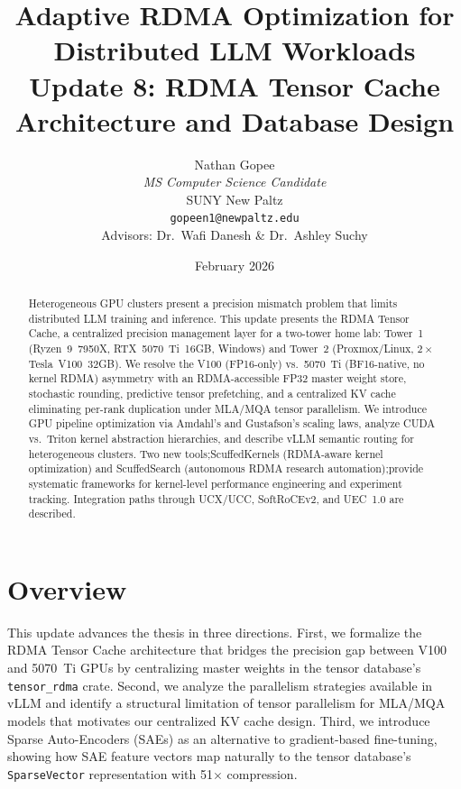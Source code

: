 \documentclass[11pt,letterpaper]{article}
\title{
    \vspace{-1cm}
    \textbf{Adaptive RDMA Optimization for Distributed LLM Workloads} \\[0.5em]
    \large Update 8: RDMA Tensor Cache Architecture and Database Design
}
\author{
    Nathan Gopee \\
    \textit{MS Computer Science Candidate} \\
    SUNY New Paltz \\
    \texttt{gopeen1@newpaltz.edu} \\[1em]
    \small Advisors: Dr.\ Wafi Danesh \& Dr.\ Ashley Suchy
}
\date{February 2026}
\theoremstyle{definition}
\begin{document}
\maketitle

\begin{abstract}
\noindent
Heterogeneous GPU clusters present a precision mismatch problem that limits distributed LLM training and inference. This update presents the RDMA Tensor Cache, a centralized precision management layer for a two-tower home lab: Tower~1 (Ryzen~9~7950X, RTX~5070~Ti~16GB, Windows) and Tower~2 (Proxmox/Linux, $2\times$ Tesla~V100~32GB). We resolve the V100 (FP16-only) vs.\ 5070~Ti (BF16-native, no kernel RDMA) asymmetry with an RDMA-accessible FP32 master weight store, stochastic rounding, predictive tensor prefetching, and a centralized KV cache eliminating per-rank duplication under MLA/MQA tensor parallelism. We introduce GPU pipeline optimization via Amdahl's and Gustafson's scaling laws, analyze CUDA vs.\ Triton kernel abstraction hierarchies, and describe vLLM semantic routing for heterogeneous clusters. Two new tools;ScuffedKernels (RDMA-aware kernel optimization) and ScuffedSearch (autonomous RDMA research automation);provide systematic frameworks for kernel-level performance engineering and experiment tracking. Integration paths through UCX/UCC, SoftRoCEv2, and UEC~1.0 are described.
\end{abstract}

\tableofcontents
\newpage

\section{Overview}
\label{sec:overview}

This update advances the thesis in three directions. First, we formalize the RDMA Tensor Cache architecture that bridges the precision gap between V100 and 5070~Ti GPUs by centralizing master weights in the tensor database's \texttt{tensor\_rdma} crate. Second, we analyze the parallelism strategies available in vLLM and identify a structural limitation of tensor parallelism for MLA/MQA models that motivates our centralized KV cache design. Third, we introduce Sparse Auto-Encoders (SAEs) as an alternative to gradient-based fine-tuning, showing how SAE feature vectors map naturally to the tensor database's \texttt{SparseVector} representation with 51$\times$ compression.
\end{document}
